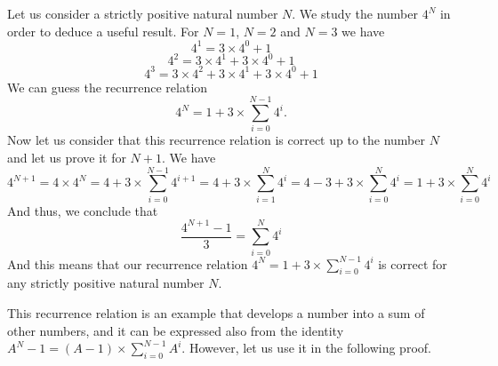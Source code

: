 \documentclass[11pt,a4paper]{article}
\theoremstyle{definition}
\begin{document}
Let us consider a strictly positive natural number $N$. We study the number $4^{N}$ in
order to deduce a useful result. For $N=1$, $N=2$ and $N=3$ we have
\begin{equation}
4^{1}=3\times 4^{0}+1
\end{equation}
\begin{equation}
4^{2}=3\times 4^{1}+3\times 4^{0}+1
\end{equation}
\begin{equation}
4^{3}=3\times 4^{2}+3\times 4^{1}+3\times 4^{0}+1
\end{equation}
We can guess the recurrence relation
\begin{equation}
4^{N}=1+3\times\sum_{i=0}^{N-1}4^{i}.
\end{equation}
Now let us consider that this recurrence relation is correct up to the number $N$ and let us
prove it for $N+1$. We have
\begin{equation}
4^{N+1}=4\times 4^{N}=4+3\times\sum_{i=0}^{N-1}4^{i+1}=4+3\times\sum_{i=1}^{N}4^{i}=4-3+3\times\sum_{i=0}^{N}4^{i}=1+3\times\sum_{i=0}^{N}4^{i}
\end{equation}
And thus, we conclude that
\begin{equation}
\frac{4^{N+1}-1}{3}=\sum_{i=0}^{N}4^{i}
\end{equation}
And this means that our recurrence relation $4^{N}=1+3\times\sum_{i=0}^{N-1}4^{i}$ is
correct for any strictly positive natural number $N$.

This recurrence relation is an example that develops a number into a sum of other numbers,
and it can be expressed also from the identity $A^{N}-1=(A-1)\times\sum_{i=0}^{N-1}A^{i}$.
However, let us use it in the following proof.
\end{document}

